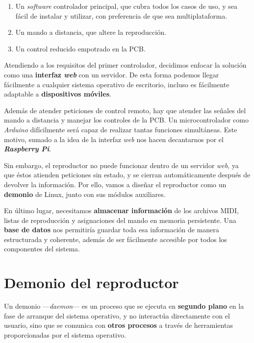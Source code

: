 \begin{enumerate}
	\item Un \textit{software} controlador principal, que cubra todos los casos de uso, y sea fácil de instalar y utilizar, con preferencia de que sea multiplataforma.
	
	\item Un mando a distancia, que altere la reproducción.
	
	\item Un control reducido empotrado en la \acrshort{PCB}.
\end{enumerate}

Atendiendo a los requisitos del primer controlador, decidimos enfocar la solución como una \textbf{interfaz \textit{web}} con un servidor. De esta forma podemos llegar fácilmente a cualquier sistema operativo de escritorio, incluso es fácilmente adaptable a \textbf{dispositivos móviles}.

Además de atender peticiones de control remoto, hay que atender las señales del mando a distancia y manejar los controles de la \acrshort{PCB}. Un microcontrolador como \textit{Arduino} difícilmente será capaz de realizar tantas funciones simultáneas. Este motivo, sumado a la idea de la interfaz \textit{web} nos hacen decantarnos por el \textbf{\textit{Raspberry Pi}}.

Sin embargo, el reproductor no puede funcionar dentro de un servidor \textit{web}, ya que éstos atienden peticiones sin estado, y se cierran automáticamente después de devolver la información. Por ello, vamos a diseñar el reproductor como un \textbf{demonio} de Linux, junto con sus módulos auxiliares.

En último lugar, necesitamos \textbf{almacenar información} de los archivos \acrshort{MIDI}, listas de reproducción y asignaciones del mando en memoria persistente. Una \textbf{base de datos} nos permitiría guardar toda esa información de manera estructurada y coherente, además de ser fácilmente accesible por todos los componentes del sistema.

\newpage

\section{Demonio del reproductor}

Un demonio ---\textit{daemon}--- es un proceso que se ejecuta en \textbf{segundo plano} en la fase de arranque del sistema operativo, y no interactúa directamente con el usuario, sino que se comunica con \textbf{otros procesos} a través de herramientas proporcionadas por el sistema operativo. \cite{wiki_demonio}

